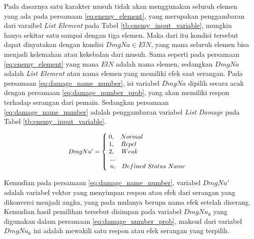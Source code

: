 Pada dasarnya satu karakter musuh tidak akan menggunakan seluruh elemen yang ada pada persamaan \ref{eq:enemy_element}, yang merupakan penggambaran dari varaibel \textit{List Element} pada Tabel \ref{tb:enemy_input_variable}, mungkin hanya sekitar satu sampai dengan tiga elemen. Maka dari itu kondisi tersebut dapat dinyatakan dengan kondisi $DmgNa \in ElN$, yang mana seluruh elemen bisa menjadi kelemahan atau kekebalan dari musuh. Sama seperti pada persamaan \ref{eq:enemy_element} yang mana $ElN$ adalah nama elemen, sedangkan $DmgNa$ adalah \textit{List Element} atau nama elemen yang memiliki efek saat serangan. Pada persamaan \ref{eq:damage_name_number}, isi variabel $DmgNa$ dipilih secara acak dengan persamaan \ref{eq:damage_number_prob}, yang akan memiliki respon terhadap serangan dari pemain. Sedangkan persamaan \ref{eq:damage_name_number} adalah penggambaran variabel \textit{List Damage} pada Tabel \ref{tb:enemy_input_variable}.
\vspace{1ex}

\begin{equation}\label{eq:damage_name_number}
\resizebox{0.5\textwidth}{!}{%
	$DmgNu' = \left\{\begin{matrix} 
	\hspace{0.0em} 0,  & \hspace{-7.0em} Normal \\
	\hspace{0.0em} 1,  & \hspace{-8.0em} Repel \\
	\hspace{0.0em} 2,  & \hspace{-7.7em} Weak \\
	\hspace{0.5em} ... & \\
	\hspace{0.5em} n,  & Defined\ Status\ Name
	\end{matrix}\right.$%
}
\end{equation}

Kemudian pada persamaan \ref{eq:damage_name_number}, variabel $DmgNu'$ adalah variabel vektor yang menyimpan respon atau efek dari serangan yang dikonversi menjadi angka, yang pada mulanya berupa nama efek setelah diserang. Kemudian hasil pemilihan tersebut disimpan pada variabel $DmgNu_{0}$ yang digunakan dalam persamaan \ref{eq:damage_number_prob}, maksud dari variabel $DmgNu_{0}$ ini adalah mewakili satu respon atau efek serangan yang terpilih.
\vspace{1ex}

